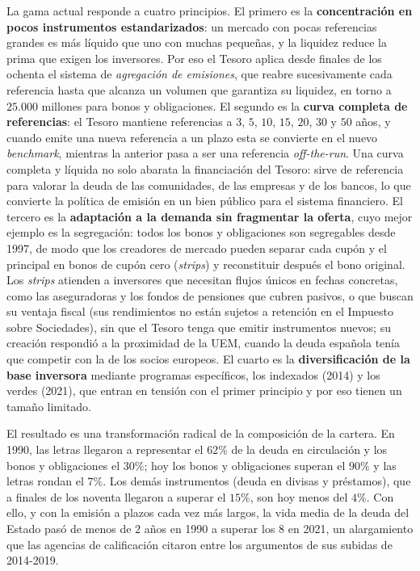 \documentclass[10pt,a4paper]{article}
\begin{document}
La gama actual responde a cuatro principios. El primero es la \textbf{concentración en pocos instrumentos estandarizados}: un mercado con pocas referencias grandes es más líquido que uno con muchas pequeñas, y la liquidez reduce la prima que exigen los inversores. Por eso el Tesoro aplica desde finales de los ochenta el sistema de \textit{agregación de emisiones}, que reabre sucesivamente cada referencia hasta que alcanza un volumen que garantiza su liquidez, en torno a $25.000$ millones para bonos y obligaciones. El segundo es la \textbf{curva completa de referencias}: el Tesoro mantiene referencias a $3$, $5$, $10$, $15$, $20$, $30$ y $50$ años, y cuando emite una nueva referencia a un plazo esta se convierte en el nuevo \textit{benchmark}, mientras la anterior pasa a ser una referencia \textit{off-the-run}. Una curva completa y líquida no solo abarata la financiación del Tesoro: sirve de referencia para valorar la deuda de las comunidades, de las empresas y de los bancos, lo que convierte la política de emisión en un bien público para el sistema financiero. El tercero es la \textbf{adaptación a la demanda sin fragmentar la oferta}, cuyo mejor ejemplo es la segregación: todos los bonos y obligaciones son segregables desde 1997, de modo que los creadores de mercado pueden separar cada cupón y el principal en bonos de cupón cero (\textit{strips}) y reconstituir después el bono original. Los \textit{strips} atienden a inversores que necesitan flujos únicos en fechas concretas, como las aseguradoras y los fondos de pensiones que cubren pasivos, o que buscan su ventaja fiscal (sus rendimientos no están sujetos a retención en el Impuesto sobre Sociedades), sin que el Tesoro tenga que emitir instrumentos nuevos; su creación respondió a la proximidad de la UEM, cuando la deuda española tenía que competir con la de los socios europeos. El cuarto es la \textbf{diversificación de la base inversora} mediante programas específicos, los indexados (2014) y los verdes (2021), que entran en tensión con el primer principio y por eso tienen un tamaño limitado.

El resultado es una transformación radical de la composición de la cartera. En 1990, las letras llegaron a representar el $62\%$ de la deuda en circulación y los bonos y obligaciones el $30\%$; hoy los bonos y obligaciones superan el $90\%$ y las letras rondan el $7\%$. Los demás instrumentos (deuda en divisas y préstamos), que a finales de los noventa llegaron a superar el $15\%$, son hoy menos del $4\%$. Con ello, y con la emisión a plazos cada vez más largos, la vida media de la deuda del Estado pasó de menos de $2$ años en 1990 a superar los $8$ en 2021, un alargamiento que las agencias de calificación citaron entre los argumentos de sus subidas de 2014-2019.
\end{document}
